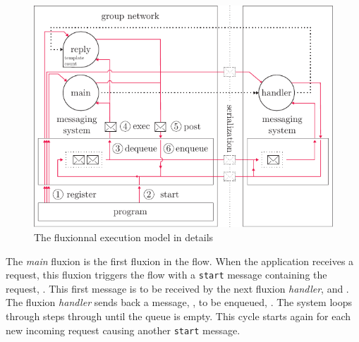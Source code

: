 
\begin{figure}[h!]
  \includegraphics[width=\linewidth]{ressources/schema-message.pdf}
  \caption{The fluxionnal execution model in details}
  \label{fig:MesSys}
\end{figure}

The \textit{main} fluxion is the first fluxion in the flow.
When the application receives a request, this fluxion triggers the flow with a \texttt{start} message containing the request, .
This first message is to be received by the next fluxion \textit{handler},  and .
The fluxion \textit{handler} sends back a message, , to be enqueued, .
The system loops through steps  through  until the queue is empty.
This cycle starts again for each new incoming request causing another \texttt{start} message.



